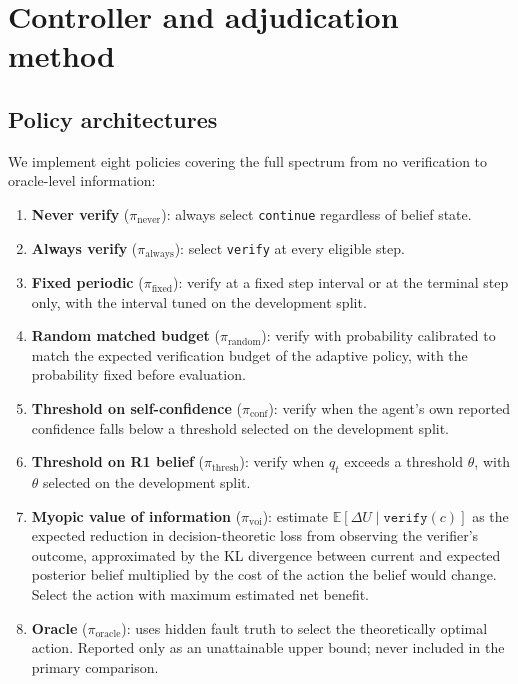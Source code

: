\section{Controller and adjudication method}
\label{sec:method}

\subsection{Policy architectures}

We implement eight policies covering the full spectrum from no verification
to oracle-level information:

\begin{enumerate}
    \item \textbf{Never verify} ($\pi_{\text{never}}$): always select
          \texttt{continue} regardless of belief state.
    \item \textbf{Always verify} ($\pi_{\text{always}}$): select
          \texttt{verify} at every eligible step.
    \item \textbf{Fixed periodic} ($\pi_{\text{fixed}}$): verify at a fixed
          step interval or at the terminal step only, with the interval
          tuned on the development split.
    \item \textbf{Random matched budget} ($\pi_{\text{random}}$): verify
          with probability calibrated to match the expected verification
          budget of the adaptive policy, with the probability fixed before
          evaluation.
    \item \textbf{Threshold on self-confidence} ($\pi_{\text{conf}}$):
          verify when the agent's own reported confidence falls below a
          threshold selected on the development split.
    \item \textbf{Threshold on R1 belief} ($\pi_{\text{thresh}}$): verify
          when $q_t$ exceeds a threshold $\theta$, with $\theta$ selected
          on the development split.
    \item \textbf{Myopic value of information} ($\pi_{\text{voi}}$):
          estimate $\mathbb{E}[\Delta U \mid \texttt{verify}(c)]$ as the
          expected reduction in decision-theoretic loss from observing the
          verifier's outcome, approximated by the KL divergence between
          current and expected posterior belief multiplied by the cost of
          the action the belief would change. Select the action with
          maximum estimated net benefit.
    \item \textbf{Oracle} ($\pi_{\text{oracle}}$): uses hidden fault truth
          to select the theoretically optimal action. Reported only as an
          unattainable upper bound; never included in the primary
          comparison.
\end{enumerate}

